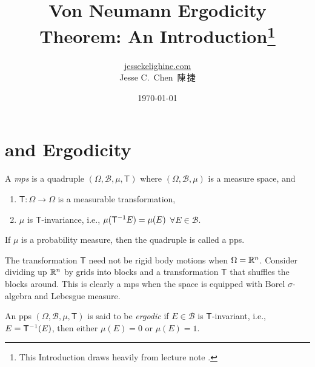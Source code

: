 \documentclass[a4paper]{article}
\title{Von Neumann Ergodicity Theorem: An Introduction\thanks{This Introduction draws heavily from lecture note \cite{sarig-2023}.}}
\author{\href{https://jessekelighine.com}{jessekelighine.com}\\Jesse C.\ Chen\ 陳\,捷}
\date{\today}
\begin{document}
\maketitle\thispagestyle{fancy}

\section{ and Ergodicity}

\begin{definition}
	A \emph{\gls{mps}} is a quadruple $(\Omega,\mathcal{B},\mu,\mathsf{T})$
	where $(\Omega,\mathcal{B},\mu)$ is a measure space, and
	\begin{enumerate}
		\item $\mathsf{T}:\Omega\to \Omega$ is a measurable transformation,
		\item $\mu$ is $\mathsf{T}$-invariance, i.e., $\mu(\mathsf{T}^{-{1}} E)=\mu(E)$ $\forall E\in\mathcal{B}$.
	\end{enumerate}
	If $\mu$ is a probability measure, then the quadruple is called a \gls{pps}.
\end{definition}

\begin{remark}
	The transformation $\mathsf{T}$ need not be rigid body motions when $\Omega=\mathbb{R}^n$.
	Consider dividing up $\mathbb{R}^n$ by grids into blocks and a transformation $\mathsf{T}$ that shuffles the blocks around.
	This is clearly a \gls{mps} when the space is equipped with Borel $\sigma$-algebra and Lebesgue measure.
\end{remark}

\begin{definition}[Ergodic]
	An \gls{pps} $(\Omega,\mathcal{B},\mu,\mathsf{T})$ is said to be \emph{ergodic}
	if $E\in\mathcal{B}$ is $\mathsf{T}$-invariant, i.e.,
	$E=\mathsf{T}^{-{1}}(E)$, then either $\mu(E)=0$ or $\mu(E)=1$.
\end{definition}
\end{document}
